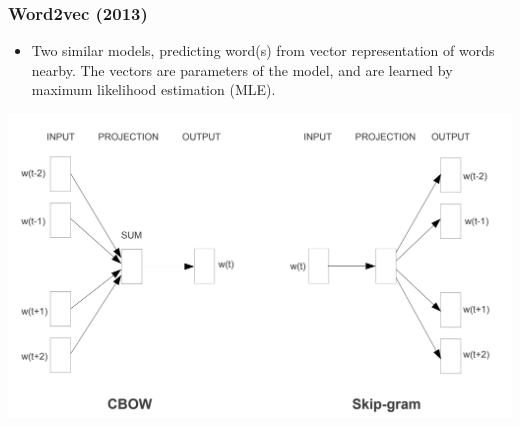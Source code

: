 \documentclass{beamer}
\begin{document}
\begin{frame}
	\frametitle{Word2vec (2013)}
	\pause
	
	\begin{itemize}
		\item Two similar models, predicting word(s) from vector representation of words nearby. The vectors are parameters of the model, and are learned by maximum likelihood estimation (MLE).
	\end{itemize}
	\begin{center}
		\includegraphics[scale=0.10]{word2vec}		
	\end{center}

	
\end{frame}
\end{document}
